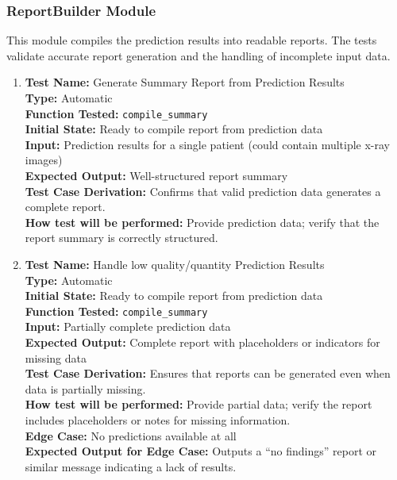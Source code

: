 \documentclass[12pt, titlepage]{article}
\begin{document}
\subsubsection{ReportBuilder Module}
This module compiles the prediction results into readable reports. The tests validate accurate report generation and the handling of incomplete input data.
\begin{enumerate}
  \item \textbf{Test Name:}  Generate Summary Report from Prediction Results\\
    \textbf{Type:}  Automatic\\
    \textbf{Function Tested:}  \verb|compile_summary|\\
    \textbf{Initial State:}  Ready to compile report from prediction data\\
    \textbf{Input:}  Prediction results for a single patient (could contain multiple x-ray images)\\
    \textbf{Expected Output:}  Well-structured report summary\\
    \textbf{Test Case Derivation:}  Confirms that valid prediction data generates a complete report.\\
    \textbf{How test will be performed:}  Provide prediction data; verify that the report summary is correctly structured.\\

  \item \textbf{Test Name:}  Handle low quality/quantity Prediction Results\\
    \textbf{Type:}  Automatic\\
    \textbf{Initial State:}  Ready to compile report from prediction data\\
    \textbf{Function Tested:}  \verb|compile_summary|\\
    \textbf{Input:}  Partially complete prediction data\\
    \textbf{Expected Output:}  Complete report with placeholders or indicators for missing data\\
    \textbf{Test Case Derivation:}  Ensures that reports can be generated even when data is partially missing.\\
    \textbf{How test will be performed:}  Provide partial data; verify the report includes placeholders or notes for missing information.\\
    \textbf{Edge Case:}  No predictions available at all\\
    \textbf{Expected Output for Edge Case:}  Outputs a “no findings” report or similar message indicating a lack of results.\\
\end{enumerate}
\end{document}
